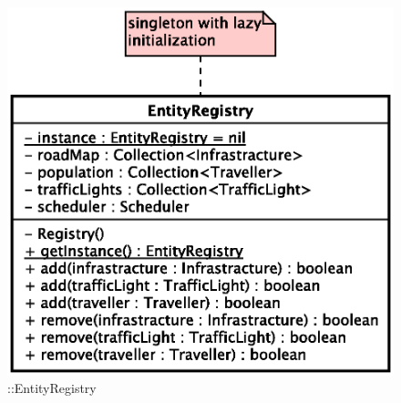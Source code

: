 \begin{figure}[h]
\centering
\includegraphics[scale=0.6,keepaspectratio]{images/solution/app/backend/entity_registry.eps}
\caption{\pReactive::EntityRegistry}
\label{fig:sd-app-entity-registry}
\end{figure}
\FloatBarrier
